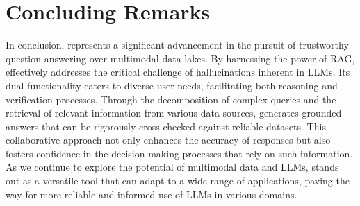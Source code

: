 \section{Concluding Remarks}
\label{sec:conclusion}

In conclusion, \sys represents a significant advancement in the pursuit of trustworthy question answering over multimodal data lakes. By harnessing the power of RAG, \sys effectively addresses the critical challenge of hallucinations inherent in LLMs. Its dual functionality caters to diverse user needs, facilitating both reasoning and verification processes. Through the decomposition of complex queries and the retrieval of relevant information from various data sources, \sys generates grounded answers that can be rigorously cross-checked against reliable datasets. This collaborative approach not only enhances the accuracy of responses but also fosters confidence in the decision-making processes that rely on such information. As we continue to explore the potential of multimodal data and LLMs, \sys stands out as a versatile tool that can adapt to a wide range of applications, paving the way for more reliable and informed use of LLMs in various domains.